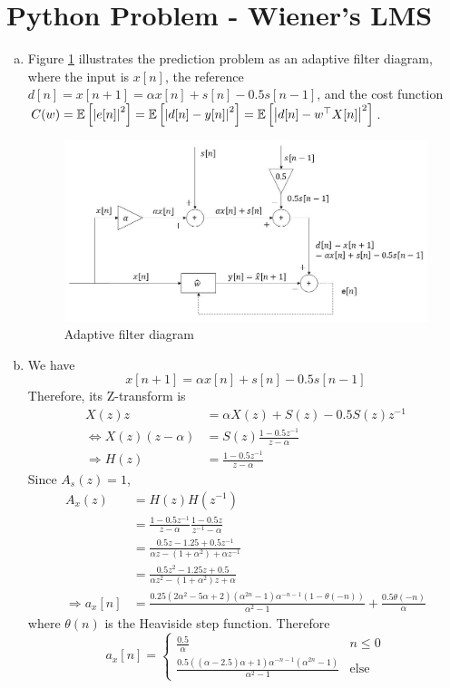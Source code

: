 \section{Python Problem - Wiener's LMS}\label{sec:p5}

\begin{enumerate}[(a)]
\item Figure \ref{fig:p5a} illustrates the prediction problem as an adaptive filter diagram, where the input is $x[n]$, the reference $d[n] = x[n+1] = \alpha x[n] + s[n] - 0.5 s[n-1]$, and the cost function $C(w) = \mathbb{E} \left[ \left\lvert e[n] \right\rvert^2 \right] = \mathbb{E} \left[ \left\lvert d[n] - y[n] \right\rvert^2 \right] = \mathbb{E} \left[ \left\lvert d[n] - w^\top X[n] \right\rvert^2 \right]$.
\begin{figure}[htbp]
	\centering
	\includegraphics[width=\textwidth]{images/p5a}
	\caption{Adaptive filter diagram}
	\label{fig:p5a}
\end{figure}

\item 
We have \[x[n+1] = \alpha x[n] + s[n] - 0.5 s[n-1]\] Therefore, its Z-transform is
\begin{align*}
	X(z)z &= \alpha X(z) + S(z) -0.5 S(z) z^{-1} \\
	\Leftrightarrow X(z)(z-\alpha) &= S(z) \frac{1 - 0.5 z^{-1}}{z - \alpha} \\
	\Rightarrow H(z) &= \frac{1 - 0.5 z^{-1}}{z - \alpha}
\end{align*}
Since $A_s(z) = 1$,
\begin{align*}
	A_x(z)
	&= H(z)H(z^{-1}) \\
	&= \frac{1 - 0.5 z^{-1}}{z - \alpha} \frac{1 - 0.5 z}{z^{-1} - \alpha} \\
	&= \frac{0.5z - 1.25 +0.5z^{-1}}{\alpha z - (1+\alpha^2) +\alpha z^{-1}} \\
	&= \frac{0.5z^2 - 1.25z +0.5}{\alpha z^2 - (1+\alpha^2)z +\alpha} \\
	\Rightarrow a_x[n]
	&= \frac{0.25(2\alpha^2 - 5\alpha +2)(\alpha^{2n}-1)\alpha^{-n-1}(1-\theta(-n))}{\alpha^2 - 1} + \frac{0.5\theta(-n)}{\alpha}
\end{align*}
where $\theta(n)$ is the Heaviside step function. Therefore
\[a_x[n] = \begin{cases}
\frac{0.5}{\alpha} & n \leq 0 \\
\frac{0.5((\alpha-2.5)\alpha+1)\alpha^{-n-1}(\alpha^{2n}-1)}{\alpha^2 - 1} & \text{else}
\end{cases}\]

\end{enumerate}